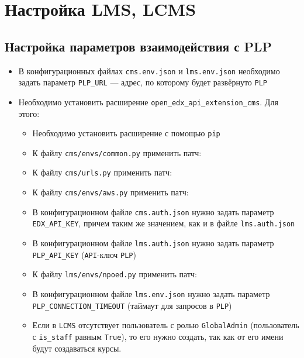 \section{Настройка LMS, LCMS}
\subsection{Настройка параметров взаимодействия с PLP}
\begin{itemize}
	\item В конфигурационных файлах \texttt{cms.env.json} и \texttt{lms.env.json} необходимо задать параметр \texttt{PLP\_URL} ---
		адрес, по которому будет развёрнуто \texttt{PLP}
	\item Необходимо установить расширение \texttt{open\_edx\_api\_extension\_cms}. Для этого:
	\begin{itemize}
		\item Необходимо установить расширение с помощью \texttt{pip}
		\item К файлу \texttt{cms/envs/common.py} применить патч:\\
			
		\item К файлу \texttt{cms/urls.py} применить патч:\\
			
		\item К файлу \texttt{cms/envs/aws.py} применить патч:\\
			
		\item В конфигурационном файле \texttt{cms.auth.json} нужно задать параметр \texttt{EDX\_API\_KEY},
			причем таким же значением, как и в файле \texttt{lms.auth.json}
		\item В конфигурационном файле \texttt{lms.auth.json} нужно задать параметр \texttt{PLP\_API\_KEY} (\texttt{API}-ключ \texttt{PLP})
		\item К файлу \texttt{lms/envs/npoed.py} применить патч:\\
			
		\item В конфигурационном файле \texttt{lms.env.json} нужно задать параметр \texttt{PLP\_CONNECTION\_TIMEOUT} (таймаут для запросов в \texttt{PLP})
		\item Если в \texttt{LCMS} отсутствует пользователь с ролью \texttt{GlobalAdmin} (пользователь с \texttt{is\_staff} равным \texttt{True}),
			то его нужно создать, так как от его имени будут создаваться курсы.
	\end{itemize}
\end{itemize}

